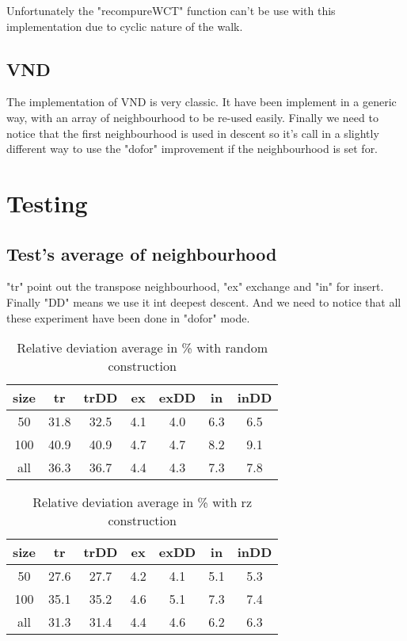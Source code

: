 \documentclass[12pt,a4paper]{article}
\begin{document}
Unfortunately the "recompureWCT" function can't be use with this implementation due to cyclic nature of the walk.

\subsection{VND}

The implementation of VND is very classic. It have been implement in a generic way, with an array of neighbourhood to be re-used easily. Finally we need to notice that the first neighbourhood is used in descent so it's call in a slightly different way to use the "dofor" improvement if the neighbourhood is set for.

\section{Testing}

\subsection{Test's average of neighbourhood}

"tr" point out the transpose neighbourhood, "ex" exchange and "in" for insert. Finally "DD" means we use it int deepest descent. And we need to notice that all these experiment have been done in "dofor" mode.

\begin{table}[!h]
\centering
\begin{tabular}{|*{7}{c|}}
  \hline
  size & tr & trDD & ex & exDD & in & inDD \\
  \hline
  50 & 31.8 & 32.5 & 4.1 & 4.0 & 6.3 & 6.5 \\ 
  100 & 40.9 & 40.9 & 4.7 & 4.7 & 8.2 & 9.1 \\
  all & 36.3 & 36.7 & 4.4 & 4.3 & 7.3 & 7.8 \\
  \hline
\end{tabular}
\caption{Relative deviation average in \% with random construction}
\label{Relative deviation with random construction}
\end{table}

\begin{table}[!h]
\centering
\begin{tabular}{|*{7}{c|}}
  \hline
  size & tr & trDD & ex & exDD & in & inDD \\
  \hline
  50 & 27.6 & 27.7 & 4.2 & 4.1 & 5.1 & 5.3 \\ 
  100 & 35.1 & 35.2 & 4.6 & 5.1 & 7.3 & 7.4 \\
  all & 31.3 & 31.4 & 4.4 & 4.6 & 6.2 & 6.3 \\
  \hline
\end{tabular}
\caption{Relative deviation average in \% with rz construction}
\label{Relative deviation with rz construction}
\end{table}
\end{document}
